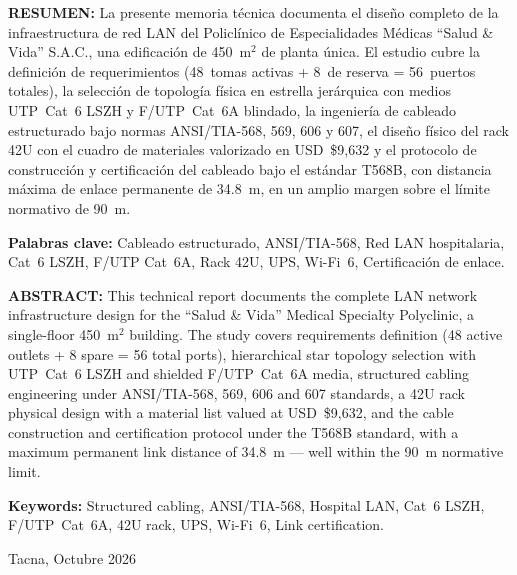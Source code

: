 \begin{titlepage}
    \vspace{0.3cm}

    \begin{center}
        \begin{minipage}{0.96\textwidth}
            {\small \textbf{RESUMEN:} La presente memoria técnica documenta el diseño completo de la infraestructura de red LAN del Policlínico de Especialidades Médicas ``Salud \& Vida'' S.A.C., una edificación de 450~m$^2$ de planta única. El estudio cubre la definición de requerimientos (48~tomas activas + 8~de reserva = 56~puertos totales), la selección de topología física en estrella jerárquica con medios UTP~Cat~6 LSZH y F/UTP~Cat~6A blindado, la ingeniería de cableado estructurado bajo normas ANSI/TIA-568, 569, 606 y 607, el diseño físico del rack 42U con el cuadro de materiales valorizado en USD~\$9,632 y el protocolo de construcción y certificación del cableado bajo el estándar T568B, con distancia máxima de enlace permanente de 34.8~m, en un amplio margen sobre el límite normativo de 90~m.\par}

            \vspace{0.2cm}
            {\small \textbf{Palabras clave:} Cableado estructurado, ANSI/TIA-568, Red LAN hospitalaria, Cat~6 LSZH, F/UTP Cat~6A, Rack 42U, UPS, Wi-Fi~6, Certificación de enlace.\par}

            \vspace{0.3cm}
            {\small \textbf{ABSTRACT:} This technical report documents the complete LAN network infrastructure design for the ``Salud \& Vida'' Medical Specialty Polyclinic, a single-floor 450~m$^2$ building. The study covers requirements definition (48 active outlets + 8 spare = 56 total ports), hierarchical star topology selection with UTP~Cat~6 LSZH and shielded F/UTP~Cat~6A media, structured cabling engineering under ANSI/TIA-568, 569, 606 and 607 standards, a 42U rack physical design with a material list valued at USD~\$9,632, and the cable construction and certification protocol under the T568B standard, with a maximum permanent link distance of 34.8~m — well within the 90~m normative limit.\par}

            \vspace{0.2cm}
            {\small \textbf{Keywords:} Structured cabling, ANSI/TIA-568, Hospital LAN, Cat~6 LSZH, F/UTP~Cat~6A, 42U rack, UPS, Wi-Fi~6, Link certification.\par}
        \end{minipage}
    \end{center}

    \vfill
    {\normalsize Tacna, Octubre 2026\par}
\end{titlepage}
